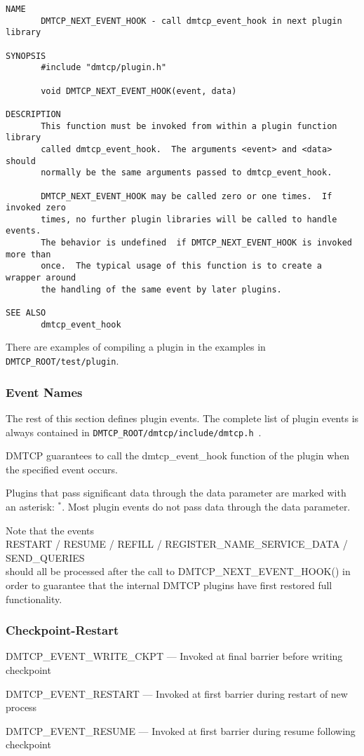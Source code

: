 \documentclass{article}
\begin{document}
\begin{verbatim}
NAME
       DMTCP_NEXT_EVENT_HOOK - call dmtcp_event_hook in next plugin library

SYNOPSIS
       #include "dmtcp/plugin.h"

       void DMTCP_NEXT_EVENT_HOOK(event, data)

DESCRIPTION
       This function must be invoked from within a plugin function library
       called dmtcp_event_hook.  The arguments <event> and <data> should
       normally be the same arguments passed to dmtcp_event_hook.

       DMTCP_NEXT_EVENT_HOOK may be called zero or one times.  If invoked zero
       times, no further plugin libraries will be called to handle events.
       The behavior is undefined  if DMTCP_NEXT_EVENT_HOOK is invoked more than
       once.  The typical usage of this function is to create a wrapper around
       the handling of the same event by later plugins.

SEE ALSO
       dmtcp_event_hook
\end{verbatim}

There are examples of compiling a plugin in the examples in {\tt
DMTCP\_ROOT/test/plugin}.

\subsubsection{Event Names}

The rest of this section defines plugin events.
The complete list of plugin events is always contained in
{\tt DMTCP\_ROOT/dmtcp/include/dmtcp.h}~.

DMTCP guarantees to call the dmtcp\_event\_hook function of the plugin
when the specified event occurs.

Plugins that pass significant data through the data parameter
are marked with an asterisk: {}$^*$.
Most plugin events do not pass data through the data parameter.

Note that the events \\
   RESTART / RESUME / REFILL / REGISTER\_NAME\_SERVICE\_DATA / SEND\_QUERIES \\
should all be processed after the call to DMTCP\_NEXT\_EVENT\_HOOK() in
order to guarantee that the internal DMTCP plugins have first restored full
functionality.

\itemsep0pt
\subsubsection*{Checkpoint-Restart}
\begin{list}{}{\leftmargin=3em \itemindent=-2em}
\item
  DMTCP\_EVENT\_WRITE\_CKPT --- Invoked at final barrier before writing checkpoint
\item
  DMTCP\_EVENT\_RESTART --- Invoked at first barrier during restart of new process
\item
  DMTCP\_EVENT\_RESUME --- Invoked at first barrier during resume following checkpoint
\end{list}
\end{document}
